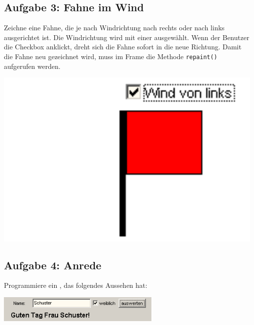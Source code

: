 \vspace{3mm}

\begin{minipage}{0.75\textwidth}
\subsection{Aufgabe 3: Fahne im Wind}

\vspace{4mm}

Zeichne eine Fahne, die je nach Windrichtung nach rechts oder nach links
ausgerichtet ist. Die Windrichtung wird mit einer 
ausgewählt. Wenn der Benutzer die Checkbox anklickt, dreht sich die Fahne sofort
in die neue Richtung. Damit die Fahne neu gezeichnet wird, muss im Frame die
Methode \lstinline|repaint()| aufgerufen werden.
\end{minipage}
\hfill
\begin{minipage}{0.25\textwidth}
\includegraphics[width=1.0\textwidth]{./inf/SEKII/24_Java_GUI-Komponenten/FahneImWind.png}
\end{minipage}


\subsection{Aufgabe 4: Anrede}

Programmiere ein , das folgendes Aussehen hat:

\begin{center}
\includegraphics[width=0.6\textwidth]{./inf/SEKII/24_Java_GUI-Komponenten/Anrede.png}
\end{center}

